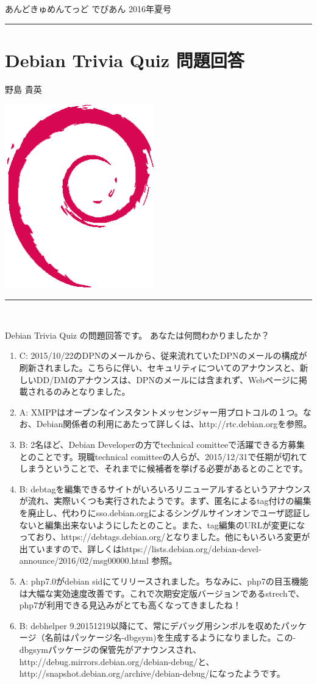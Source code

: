 \documentclass[mingoth,a4paper]{jsarticle}
\renewcommand{\dancersection}[2]{%
\newpage
あんどきゅめんてっど でびあん 2016年夏号
%
\vspace{0.1mm}\\
{\color{dancerdarkblue}\rule{\hsize}{2mm}}

%
%
\begin{minipage}[t]{0.6\hsize}
\color{dancerdarkblue}
\vspace{1cm}
\section{#1}
\hfill{}#2\\
\end{minipage}
\begin{minipage}[t]{0.4\hsize}
\vspace{-2cm}
\hfill{}\includegraphics[height=8cm]{image200502/openlogo-nd.eps}\\
\vspace{-5cm}
\end{minipage}
%
{\color{dancerlightblue}\rule{0.66\hsize}{2mm}}
%
\vspace{2cm}
}
\begin{document}
\dancersection{Debian Trivia Quiz 問題回答}{野島 貴英}
\\
{\small
 Debian Trivia Quiz の問題回答です。 あなたは何問わかりましたか？ \\
\begin{enumerate}
\item  C: 2015/10/22のDPNのメールから、従来流れていたDPNのメールの構成が刷新されました。こちらに伴い、セキュリティについてのアナウンスと、新しいDD/DMのアナウンスは、DPNのメールには含まれず、Webページに掲載されるのみとなりました。\\
\item  A: XMPPはオープンなインスタントメッセンジャー用プロトコルの１つ。なお、Debian関係者の利用にあたって詳しくは、http://rtc.debian.orgを参照。\\
\item  B: 2名ほど、Debian Developerの方でtechnical comitteeで活躍できる方募集とのことです。現職technical comitteeの人らが、2015/12/31で任期が切れてしまうということで、それまでに候補者を挙げる必要があるとのことです。\\
\item  B: debtagを編集できるサイトがいろいろリニューアルするというアナウンスが流れ、実際いくつも実行されたようです。まず、匿名によるtag付けの編集を廃止し、代わりにsso.debian.orgによるシングルサインオンでユーザ認証しないと編集出来ないようにしたとのこと。また、tag編集のURLが変更になっており、https://debtags.debian.org/となりました。他にもいろいろ変更が出ていますので、詳しくはhttps://lists.debian.org/debian-devel-announce/2016/02/msg00000.html 参照。\\
\item  A: php7.0がdebian sidにてリリースされました。ちなみに、php7の目玉機能は大幅な実効速度改善です。これで次期安定版バージョンであるstrechで、php7が利用できる見込みがとても高くなってきましたね！\\
\item  B: debhelper 9.20151219以降にて、常にデバッグ用シンボルを収めたパッケージ（名前はパッケージ名-dbgsym)を生成するようになりました。この-dbgsymパッケージの保管先がアナウンスされ、http://debug.mirrors.debian.org/debian-debug/と、http://snapshot.debian.org/archive/debian-debug/になったようです。\\

\end{enumerate}}
\end{document}
